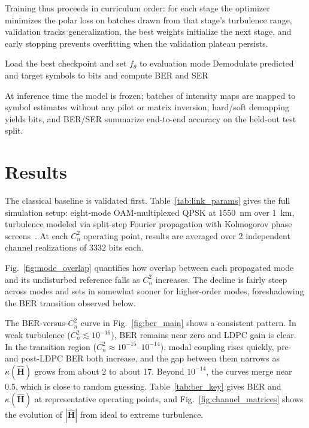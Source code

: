 \documentclass[journal]{IEEEtran}
\begin{document}
Training thus proceeds in curriculum order: for each stage the optimizer minimizes the polar loss on batches drawn from that stage's turbulence range, validation tracks generalization, the best weights initialize the next stage, and early stopping prevents overfitting when the validation plateau persists.

\begin{algorithm}[!t]
\caption{Neural Receiver Inference}
\label{alg:neural_inference}
Load the best checkpoint and set $f_\theta$ to evaluation mode\;
Demodulate predicted and target symbols to bits and compute BER and SER\;
\end{algorithm}

At inference time the model is frozen; batches of intensity maps are mapped to symbol estimates without any pilot or matrix inversion, hard/soft demapping yields bits, and BER/SER summarize end-to-end accuracy on the held-out test split.

\section{Results}
\label{sec:results}

The classical baseline is validated first. Table~\ref{tab:link_params} gives the full simulation setup: eight-mode OAM-multiplexed QPSK at 1550~nm over 1~km, turbulence modeled via split-step Fourier propagation with Kolmogorov phase screens~\cite{schmidt2010numerical, andrews2005laser}. At each $C_n^2$ operating point, results are averaged over 2 independent channel realizations of 3332 bits each.

Fig.~\ref{fig:mode_overlap} quantifies how overlap between each propagated mode and its undisturbed reference falls as $C_n^2$ increases. The decline is fairly steep across modes and sets in somewhat sooner for higher-order modes, foreshadowing the BER transition observed below.


The BER-versus-$C_n^2$ curve in Fig.~\ref{fig:ber_main} shows a consistent pattern. In weak turbulence ($C_n^2 \lesssim 10^{-16}$), BER remains near zero and LDPC gain is clear. In the transition region ($C_n^2 \approx 10^{-15}$--$10^{-14}$), modal coupling rises quickly, pre- and post-LDPC BER both increase, and the gap between them narrows as $\kappa(\hat{\mathbf{H}})$ grows from about 2 to about 17. Beyond $10^{-14}$, the curves merge near 0.5, which is close to random guessing. Table~\ref{tab:ber_key} gives BER and $\kappa(\hat{\mathbf{H}})$ at representative operating points, and Fig.~\ref{fig:channel_matrices} shows the evolution of $|\hat{\mathbf{H}}|$ from ideal to extreme turbulence.
\end{document}
